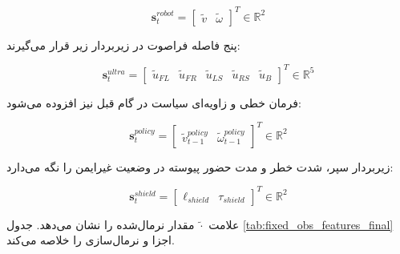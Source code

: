 \begin{equation}
	\mathbf{s}^{robot}_t =
	\begin{bmatrix}
		\tilde{v} &
		\tilde{\omega}
	\end{bmatrix}^{T}
	\in \mathbb{R}^{2}
	\label{eq:robot_fixed_features}
\end{equation}

پنج فاصله فراصوت در زیر‌بردار زیر قرار می‌گیرند:

\begin{equation}
	\mathbf{s}^{ultra}_t =
	\begin{bmatrix}
		\tilde{u}_{FL} &
		\tilde{u}_{FR} &
		\tilde{u}_{LS} &
		\tilde{u}_{RS} &
		\tilde{u}_{B}
	\end{bmatrix}^{T}
	\in \mathbb{R}^{5}
	\label{eq:ultrasonic_fixed_features}
\end{equation}

فرمان خطی و زاویه‌ای سیاست در گام قبل نیز افزوده می‌شود:

\begin{equation}
	\mathbf{s}^{policy}_t =
	\begin{bmatrix}
		\tilde{v}^{policy}_{t-1} &
		\tilde{\omega}^{policy}_{t-1}
	\end{bmatrix}^{T}
	\in \mathbb{R}^{2}
	\label{eq:policy_fixed_features}
\end{equation}

زیر‌بردار سپر، شدت خطر و مدت حضور پیوسته در وضعیت غیرایمن را نگه می‌دارد:

\begin{equation}
	\mathbf{s}^{shield}_t =
	\begin{bmatrix}
		\ell_{shield} &
		\tau_{shield}
	\end{bmatrix}^{T}
	\in \mathbb{R}^{2}
	\label{eq:shield_fixed_features}
\end{equation}

علامت \(\tilde{\cdot}\) مقدار نرمال‌شده را نشان می‌دهد. جدول \ref{tab:fixed_obs_features_final} اجزا و نرمال‌سازی را خلاصه می‌کند.

